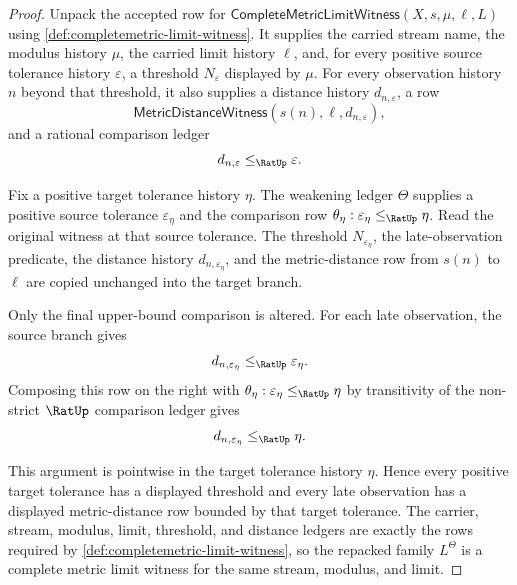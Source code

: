 \begin{proof}
Unpack the accepted row for
$\mathsf{CompleteMetricLimitWitness}(X,s,\mu,\ell,L)$ using
\autoref{def:completemetric-limit-witness}. It supplies the carried stream
name, the modulus history $\mu$, the carried limit history $\ell$, and, for
every positive source tolerance history $\varepsilon$, a threshold
$N_\varepsilon$ displayed by $\mu$. For every observation history $n$ beyond
that threshold, it also supplies a distance history $d_{n,\varepsilon}$, a row
$$
\mathsf{MetricDistanceWitness}(s(n),\ell,d_{n,\varepsilon}),
$$
and a rational comparison ledger
$$
d_{n,\varepsilon}\le_{\RatUp}\varepsilon.
$$

Fix a positive target tolerance history $\eta$. The weakening ledger $\Theta$
supplies a positive source tolerance $\varepsilon_\eta$ and the comparison row
$\theta_\eta:\varepsilon_\eta\le_{\RatUp}\eta$. Read the original witness at
that source tolerance. The threshold $N_{\varepsilon_\eta}$, the late-observation
predicate, the distance history $d_{n,\varepsilon_\eta}$, and the metric-distance
row from $s(n)$ to $\ell$ are copied unchanged into the target branch.

Only the final upper-bound comparison is altered. For each late observation,
the source branch gives
$$
d_{n,\varepsilon_\eta}\le_{\RatUp}\varepsilon_\eta.
$$
Composing this row on the right with
$\theta_\eta:\varepsilon_\eta\le_{\RatUp}\eta$ by transitivity of the non-strict
$\RatUp$ comparison ledger gives
$$
d_{n,\varepsilon_\eta}\le_{\RatUp}\eta.
$$

This argument is pointwise in the target tolerance history $\eta$. Hence every
positive target tolerance has a displayed threshold and every late observation
has a displayed metric-distance row bounded by that target tolerance. The
carrier, stream, modulus, limit, threshold, and distance ledgers are exactly the
rows required by \autoref{def:completemetric-limit-witness}, so the repacked
family $L^\Theta$ is a complete metric limit witness for the same stream,
modulus, and limit.
\end{proof}

